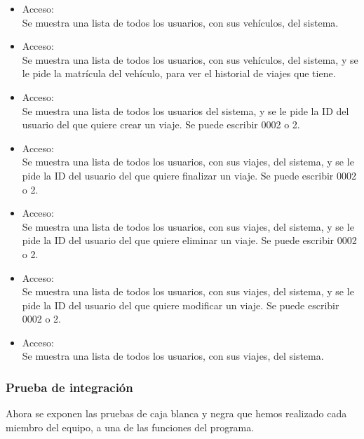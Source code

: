 \begin{itemize}
  \item Acceso:\\
  Se muestra una lista de todos los usuarios, con sus vehículos, del sistema.

  \item Acceso:\\
  Se muestra una lista de todos los usuarios, con sus vehículos, del sistema, y se le pide la matrícula del vehículo, para ver el historial de viajes que tiene.

  \item Acceso:\\
  Se muestra una lista de todos los usuarios del sistema, y se le pide la ID del usuario del que quiere crear un viaje. Se puede escribir 0002 o 2.

  \item Acceso:\\
  Se muestra una lista de todos los usuarios, con sus viajes, del sistema, y se le pide la ID del usuario del que quiere finalizar un viaje. Se puede escribir 0002 o 2.

  \item Acceso:\\
  Se muestra una lista de todos los usuarios, con sus viajes, del sistema, y se le pide la ID del usuario del que quiere eliminar un viaje. Se puede escribir 0002 o 2.

  \item Acceso:\\
  Se muestra una lista de todos los usuarios, con sus viajes, del sistema, y se le pide la ID del usuario del que quiere modificar un viaje. Se puede escribir 0002 o 2.

  \item Acceso:\\
  Se muestra una lista de todos los usuarios, con sus viajes, del sistema.
\end{itemize}

\subsubsection{Prueba de integración}

Ahora se exponen las pruebas de caja blanca y negra que hemos realizado cada miembro del equipo, a una de las funciones del programa.





